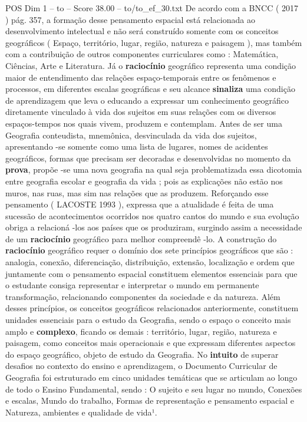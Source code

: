 \begin{textsample}{POS Dim 1 – to – Score 38.00 – to/to\_ef\_30.txt}
De acordo com a BNCC ( 2017 ) pág. 357, a formação desse pensamento espacial está relacionada ao desenvolvimento intelectual e não será construído somente com os conceitos geográficos ( Espaço, território, lugar, região, natureza e paisagem ), mas também com a contribuição de outros componentes curriculares como : Matemática, Ciências, Arte e Literatura.
Já o \textbf{raciocínio} geográfico representa uma condição maior de entendimento das relações espaço-temporais entre os fenômenos e processos, em diferentes escalas geográficas e seu alcance \textbf{sinaliza} uma condição de aprendizagem que leva o educando a expressar um conhecimento geográfico diretamente vinculado à vida dos sujeitos em suas relações com os diversos espaços-tempos nos quais vivem, produzem e contemplam.
Antes de ser uma Geografia conteudista, mnemônica, desvinculada da vida dos sujeitos, apresentando -se somente como uma lista de lugares, nomes de acidentes geográficos, formas que precisam ser decoradas e desenvolvidas no momento da \textbf{prova}, propõe -se uma nova geografia na qual seja problematizada essa dicotomia entre geografia escolar e geografia da vida ; pois as explicações não estão nos muros, nas ruas, mas sim nas relações que as produzem.
Reforçando esse pensamento ( LACOSTE 1993 ), expressa que a atualidade é feita de uma sucessão de acontecimentos ocorridos nos quatro cantos do mundo e sua evolução obriga a relacioná -los aos países que os produziram, surgindo assim a necessidade de um \textbf{raciocínio} geográfico para melhor compreendê -lo.
A construção do \textbf{raciocínio} geográfico requer o domínio dos sete princípios geográficos que são : analogia, conexão, diferenciação, distribuição, extensão, localização e ordem que juntamente com o pensamento espacial constituem elementos essenciais para que o estudante consiga representar e interpretar o mundo em permanente transformação, relacionando componentes da sociedade e da natureza.
Além desses princípios, os conceitos geográficos relacionados anteriormente, constituem unidades essenciais para o estudo da Geografia, sendo o espaço o conceito mais amplo e \textbf{complexo}, ficando os demais : território, lugar, região, natureza e paisagem, como conceitos mais operacionais e que expressam diferentes aspectos do espaço geográfico, objeto de estudo da Geografia.
No \textbf{intuito} de superar desafios no contexto do ensino e aprendizagem, o Documento Curricular de Geografia foi estruturado em cinco unidades temáticas que se articulam ao longo de todo o Ensino Fundamental, sendo : O sujeito e seu lugar no mundo, Conexões e escalas, Mundo do trabalho, Formas de representação e pensamento espacial e Natureza, ambientes e qualidade de vida¹.

\end{textsample}
